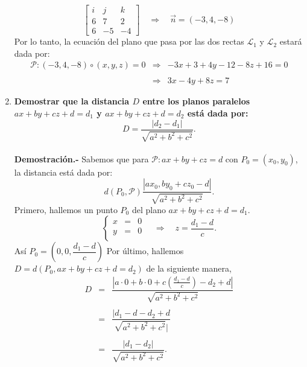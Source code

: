 \begin{enumerate}
$$	\left[\begin{array}{rrr}	
		i & j & k\\
		6 & 7 & 2\\
		6 & -5 & -4
	\end{array}\right]
	\quad \Rightarrow \quad \vec{n}=(-3,4,-8)
	$$
	Por lo tanto, la ecuación del plano que pasa por las dos rectas $\mathscr{L}_1$ y $\mathscr{L}_2$ estará dada por:
	$$\begin{array}{rcl}
	   \mathscr{P}: (-3,4,-8)\circ(x,y,z)=0 &\Rightarrow& -3x+3+4y-12-8z+16=0\\\\
				       &\Rightarrow& 3x-4y+8z=7
	\end{array}$$
	\vspace{0.5cm}



    \item \textbf{\boldmath Demostrar que la distancia $D$ entre los planos paralelos $ax+by+cz+d=d_1$ y $ax+by+cz+d=d_2$ está dada por:
    $$D=\dfrac{|d_2-d_1|}{\sqrt{a^2+b^2+c^2}}.$$\\
	Demostración.-}\; Sabemos que  para $\mathscr{P}:ax+by+cz=d$ con $P_0=(x_0,y_0)$, la distancia está dada por:
	$$d(P_0,\mathscr{P})\dfrac{|ax_0,by_0+cz_0-d|}{\sqrt{a^2+b^2+c^2}}.$$
	Primero, hallemos un punto $P_0$ del plano $ax+by+cz+d=d_1$.
	$$\left\{\begin{array}{rcl}
	    x&=&0\\
	    y&=&0\\
    \end{array}\right.\quad \Rightarrow \quad z=\dfrac{d_1-d}{c}.$$
    Así $P_0=\left(0,0,\dfrac{d_1-d}{c}\right)$
    Por último, hallemos $D=d(P_0,ax+by+cz+d=d_2)$ de la siguiente manera,
    $$\begin{array}{rcl}
	D&=&\dfrac{|a\cdot 0+b\cdot 0 +c\left(\frac{d_1-d}{c}\right)-d_2+d|}{\sqrt{a^2+b^2+c^2}}\\\\
	 &=&\dfrac{|d_1-d-d_2+d}{\sqrt{a^2+b^2+c^2}|}\\\\
	 &=&\dfrac{|d_1-d_2|}{\sqrt{a^2+b^2+c^2}}.\\\\
    \end{array}$$

    \end{enumerate}
